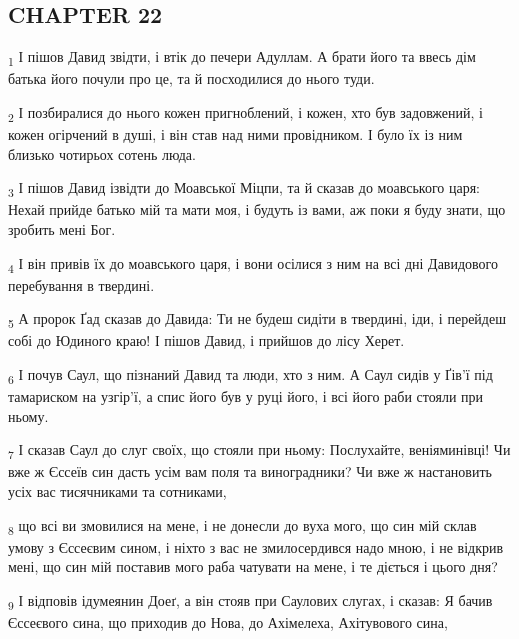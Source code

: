 \subsection{CHAPTER 22}
\begin{tcolorbox}
\textsubscript{1} І пішов Давид звідти, і втік до печери Адуллам. А брати його та ввесь дім батька його почули про це, та й посходилися до нього туди.
\end{tcolorbox}
\begin{tcolorbox}
\textsubscript{2} І позбиралися до нього кожен пригноблений, і кожен, хто був задовжений, і кожен огірчений в душі, і він став над ними провідником. І було їх із ним близько чотирьох сотень люда.
\end{tcolorbox}
\begin{tcolorbox}
\textsubscript{3} І пішов Давид ізвідти до Моавської Міцпи, та й сказав до моавського царя: Нехай прийде батько мій та мати моя, і будуть із вами, аж поки я буду знати, що зробить мені Бог.
\end{tcolorbox}
\begin{tcolorbox}
\textsubscript{4} І він привів їх до моавського царя, і вони осілися з ним на всі дні Давидового перебування в твердині.
\end{tcolorbox}
\begin{tcolorbox}
\textsubscript{5} А пророк Ґад сказав до Давида: Ти не будеш сидіти в твердині, іди, і перейдеш собі до Юдиного краю! І пішов Давид, і прийшов до лісу Херет.
\end{tcolorbox}
\begin{tcolorbox}
\textsubscript{6} І почув Саул, що пізнаний Давид та люди, хто з ним. А Саул сидів у Ґів'ї під тамариском на узгір'ї, а спис його був у руці його, і всі його раби стояли при ньому.
\end{tcolorbox}
\begin{tcolorbox}
\textsubscript{7} І сказав Саул до слуг своїх, що стояли при ньому: Послухайте, веніяминівці! Чи вже ж Єссеїв син дасть усім вам поля та виноградники? Чи вже ж настановить усіх вас тисячниками та сотниками,
\end{tcolorbox}
\begin{tcolorbox}
\textsubscript{8} що всі ви змовилися на мене, і не донесли до вуха мого, що син мій склав умову з Єссеєвим сином, і ніхто з вас не змилосердився надо мною, і не відкрив мені, що син мій поставив мого раба чатувати на мене, і те діється і цього дня?
\end{tcolorbox}
\begin{tcolorbox}
\textsubscript{9} І відповів ідумеянин Доеґ, а він стояв при Саулових слугах, і сказав: Я бачив Єссеєвого сина, що приходив до Нова, до Ахімелеха, Ахітувового сина,
\end{tcolorbox}
